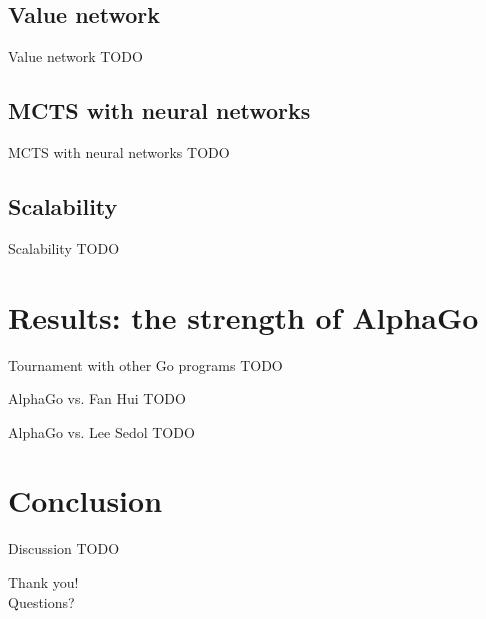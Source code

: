 \documentclass{beamer}
\newcommand{\todo}{\alert{TODO}}
\begin{document}
  \subsection{Value network}
  \begin{frame}{Value network}
    \todo
  \end{frame}

  \subsection{MCTS with neural networks}
  \begin{frame}{MCTS with neural networks}
    \todo
  \end{frame}

  \subsection{Scalability}
  \begin{frame}{Scalability}
    \todo
  \end{frame}


  \section{Results: the strength of AlphaGo}

  \begin{frame}{Tournament with other Go programs}
    \todo
  \end{frame}

  \begin{frame}{AlphaGo vs. Fan Hui}
    \todo
  \end{frame}

  \begin{frame}{AlphaGo vs. Lee Sedol}
    \todo
  \end{frame}


  \section{Conclusion}

  \begin{frame}{Discussion}
    \todo
  \end{frame}

  \begin{frame}
    \begin{center}
      Thank you! \\
      Questions?
    \end{center}
  \end{frame}
\end{document}
